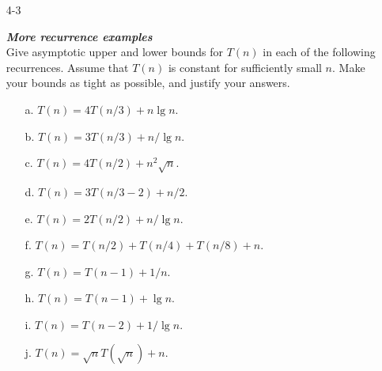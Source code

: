 \documentclass{report}
\begin{document}
\begin{enumerate}
\newpage

\item[4{-}3]{\textbf{\emph{More recurrence examples}}\\
Give asymptotic upper and lower bounds for $T(n)$ in each of the following
recurrences. Assume that $T(n)$ is constant for sufficiently small $n$. Make
your bounds as tight as possible, and justify your answers.

\begin{enumerate}
  \item[a.] $T(n) = 4T(n/3) + n \lg n$.
  \item[b.] $T(n) = 3T(n/3) + n / \lg n$.
  \item[c.] $T(n) = 4T(n/2) + n^2 \sqrt n$.
  \item[d.] $T(n) = 3T(n/3 - 2) + n/2$.
  \item[e.] $T(n) = 2T(n/2) + n / \lg n$.
  \item[f.] $T(n) = T(n/2) + T(n/4) + T(n/8) + n$.
  \item[g.] $T(n) = T(n - 1) + 1/n$.
  \item[h.] $T(n) = T(n - 1) + \lg n$.
  \item[i.] $T(n) = T(n - 2) + 1 / \lg n$.
  \item[j.] $T(n) = \sqrt n T(\sqrt n) + n$.
\end{enumerate}
}


\end{enumerate}
\end{document}

